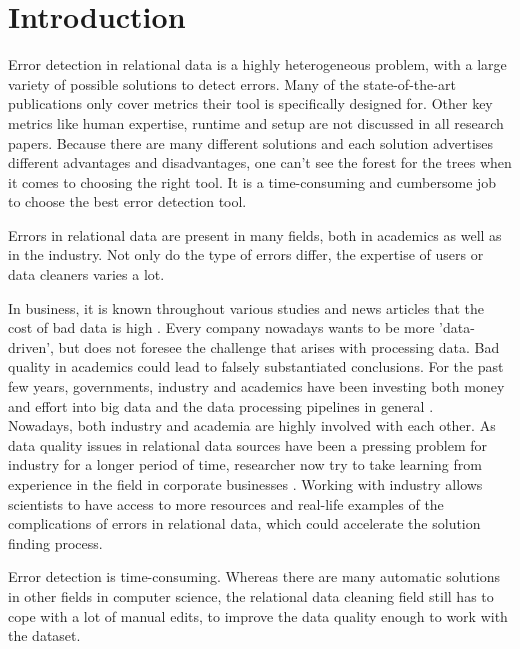 
\section{Introduction}

Error detection in relational data is a highly heterogeneous problem, with a large variety of possible solutions to detect errors. Many of the state-of-the-art publications only cover metrics their tool is specifically designed for. Other key metrics like human expertise, runtime and setup are not discussed in all research papers. Because there are many different solutions and each solution advertises different advantages and disadvantages, one can't see the forest for the trees when it comes to choosing the right tool. It is a time-consuming and cumbersome job to choose the best error detection tool.

Errors in relational data are present in many fields, both in academics as well as in the industry. Not only do the type of errors differ, the expertise of users or data cleaners varies a lot. 

In business, it is known throughout various studies and news articles that the cost of bad data is high \cite{Ilyas2015-oh}. Every company nowadays wants to be more 'data-driven', but does not foresee the challenge that arises with processing data. Bad quality in academics could lead to falsely substantiated conclusions. For the past few years, governments, industry and academics have been investing both money and effort into big data and the data processing pipelines in general \cite{Cai2015-hr}. \\Nowadays, both industry and academia are highly involved with each other. As data quality issues in relational data sources have been a pressing problem for industry for a longer period of time, researcher now try to take learning from experience in the field in corporate businesses \cite{Stonebraker2018-ag}. Working with industry allows scientists to have access to more resources and real-life examples of the complications of errors in relational data, which could accelerate the solution finding process.

Error detection is time-consuming. Whereas there are many automatic solutions in other fields in computer science, the relational data cleaning field still has to cope with a lot of manual edits, to improve the data quality enough to work with the dataset.

